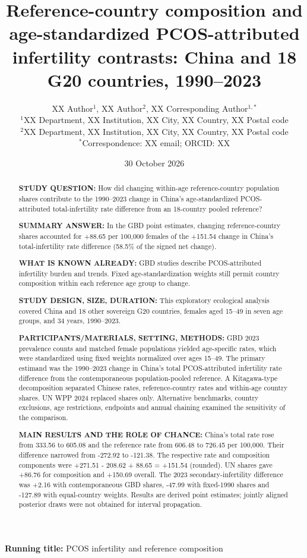 \documentclass[11pt,a4paper]{article}
\title{Reference-country composition and age-standardized PCOS-attributed infertility contrasts: China and 18 G20 countries, 1990--2023}
\author{XX Author$^{1}$, XX Author$^{2}$, XX Corresponding Author$^{1,*}$\\
{\small $^{1}$XX Department, XX Institution, XX City, XX Country, XX Postal code}\\
{\small $^{2}$XX Department, XX Institution, XX City, XX Country, XX Postal code}\\
{\small $^{*}$Correspondence: XX email; ORCID: XX}}
\date{30 October 2026}
\begin{document}
\maketitle\thispagestyle{fancy}
\noindent\textbf{Running title:} PCOS infertility and reference composition

\linenumbers
\begingroup\sloppy
\begin{abstract}
\noindent\textbf{STUDY QUESTION:} How did changing within-age reference-country population shares contribute to the 1990--2023 change in China's age-standardized PCOS-attributed total-infertility rate difference from an 18-country pooled reference?

\noindent\textbf{SUMMARY ANSWER:} In the GBD point estimates, changing reference-country shares accounted for +88.65 per 100,000 females of the +151.54 change in China's total-infertility rate difference (58.5\% of the signed net change).

\noindent\textbf{WHAT IS KNOWN ALREADY:} GBD studies describe PCOS-attributed infertility burden and trends. Fixed age-standardization weights still permit country composition within each reference age group to change.

\noindent\textbf{STUDY DESIGN, SIZE, DURATION:} This exploratory ecological analysis covered China and 18 other sovereign G20 countries, females aged 15--49 in seven age groups, and 34 years, 1990--2023.

\noindent\textbf{PARTICIPANTS/MATERIALS, SETTING, METHODS:} GBD 2023 prevalence counts and matched female populations yielded age-specific rates, which were standardized using fixed weights normalized over ages 15--49. The primary estimand was the 1990--2023 change in China's total PCOS-attributed infertility rate difference from the contemporaneous population-pooled reference. A Kitagawa-type decomposition separated Chinese rates, reference-country rates and within-age country shares. UN WPP 2024 replaced shares only. Alternative benchmarks, country exclusions, age restrictions, endpoints and annual chaining examined the sensitivity of the comparison.

\noindent\textbf{MAIN RESULTS AND THE ROLE OF CHANCE:} China's total rate rose from 333.56 to 605.08 and the reference rate from 606.48 to 726.45 per 100,000. Their difference narrowed from -272.92 to -121.38. The respective rate and composition components were +271.51 - 208.62 + 88.65 = +151.54 (rounded). UN shares gave +86.76 for composition and +150.69 overall. The 2023 secondary-infertility difference was +2.16 with contemporaneous GBD shares, -47.99 with fixed-1990 shares and -127.89 with equal-country weights. Results are derived point estimates; jointly aligned posterior draws were not obtained for interval propagation.


\end{abstract}
\end{document}
